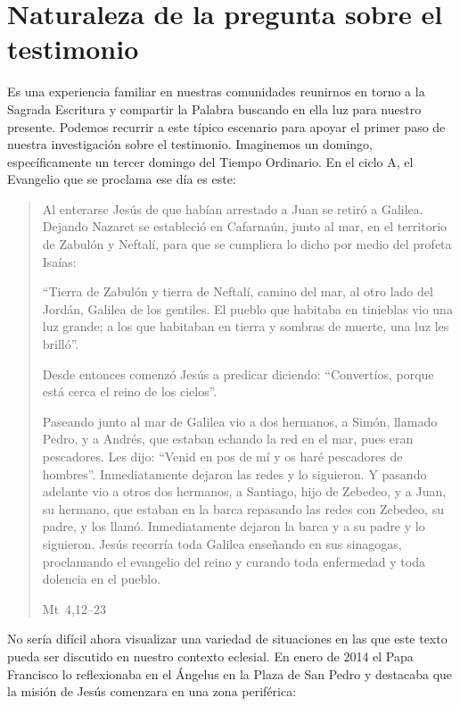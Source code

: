 \section{Naturaleza de la pregunta sobre el testimonio}

Es una experiencia familiar en nuestras comunidades reunirnos en torno a la
Sagrada Escritura y compartir la Palabra buscando en ella luz para nuestro
presente. Podemos recurrir a este típico escenario para apoyar el primer paso de
nuestra investigación sobre el testimonio. Imaginemos un domingo,
específicamente un tercer domingo del Tiempo Ordinario. En el ciclo A, el
Evangelio que se proclama ese día es este:

\blockquote[Mt~4,12--23]{Al enterarse Jesús de que habían arrestado a Juan se
  retiró a Galilea. Dejando Nazaret se estableció en Cafarnaún, junto al mar, en
  el territorio de Zabulón y Neftalí, para que se cumpliera lo dicho por medio
  del profeta Isaías:

  \enquote{Tierra de Zabulón y tierra de Neftalí, camino del mar, al otro lado
    del Jordán, Galilea de los gentiles. El pueblo que habitaba en tinieblas vio
    una luz grande; a los que habitaban en tierra y sombras de muerte, una luz
    les brilló}.

  Desde entonces comenzó Jesús a predicar diciendo: \enquote{Convertíos, porque
    está cerca el reino de los cielos}.

  Paseando junto al mar de Galilea vio a dos hermanos, a Simón, llamado Pedro, y
  a Andrés, que estaban echando la red en el mar, pues eran pescadores. Les
  dijo: \enquote{Venid en pos de mí y os haré pescadores de hombres}.
  Inmediatamente dejaron las redes y lo siguieron. Y pasando adelante vio a
  otros dos hermanos, a Santiago, hijo de Zebedeo, y a Juan, su hermano, que
  estaban en la barca repasando las redes con Zebedeo, su padre, y los llamó.
  Inmediatamente dejaron la barca y a su padre y lo siguieron. Jesús recorría
  toda Galilea enseñando en sus sinagogas, proclamando el evangelio del reino y
  curando toda enfermedad y toda dolencia en el pueblo.}

No sería difícil ahora visualizar una variedad de situaciones en las que este
texto pueda ser discutido en nuestro contexto eclesial. En enero de 2014 el Papa
Francisco lo reflexionaba en el Ángelus en la Plaza de San Pedro y destacaba que
la misión de Jesús comenzara en una zona periférica:

